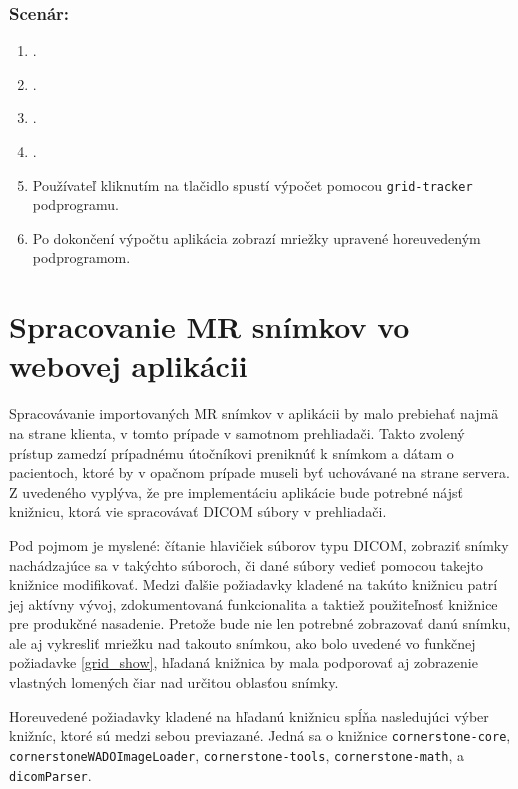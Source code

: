 {\subsubsection*{Scenár:}
\begin {enumerate}
\item {}.
\item {}.
\item {}.
\item {}.
\item {Používateľ kliknutím na tlačidlo  spustí výpočet pomocou \texttt{grid-tracker} podprogramu.}
\item {Po dokončení výpočtu aplikácia zobrazí mriežky upravené horeuvedeným podprogramom.}
\end {enumerate}

\section {Spracovanie MR snímkov vo webovej aplikácii}

Spracovávanie importovaných MR snímkov v aplikácii by malo prebiehať najmä na strane klienta, v tomto prípade v samotnom prehliadači. Takto zvolený prístup zamedzí prípadnému útočníkovi preniknúť k snímkom a dátam o pacientoch, ktoré by v opačnom prípade museli byť uchovávané na strane servera. Z uvedeného vyplýva, že pre implementáciu aplikácie bude potrebné nájsť knižnicu, ktorá vie spracovávať DICOM súbory v prehliadači.

Pod pojmom  je myslené: čítanie hlavičiek súborov typu DICOM, zobraziť snímky nachádzajúce sa v takýchto súboroch, či dané  súbory vedieť pomocou takejto knižnice modifikovať. Medzi ďalšie požiadavky kladené na takúto knižnicu patrí jej aktívny vývoj, zdokumentovaná funkcionalita a taktiež použiteľnosť knižnice pre produkčné nasadenie. Pretože bude nie len potrebné zobrazovať danú snímku, ale aj vykresliť mriežku nad takouto snímkou, ako bolo uvedené vo funkčnej požiadavke \ref{grid_show}, hľadaná knižnica by mala podporovať aj zobrazenie vlastných lomených čiar nad určitou oblasťou snímky.

Horeuvedené požiadavky kladené na hľadanú knižnicu spĺňa nasledujúci výber knižníc, ktoré sú medzi sebou previazané.
Jedná sa o knižnice \texttt{cornerstone-core}, \texttt{cornerstoneWADOImageLoader}, \texttt{cornerstone-tools}, \texttt{cornerstone-math}, a \texttt{dicomParser}.

}
